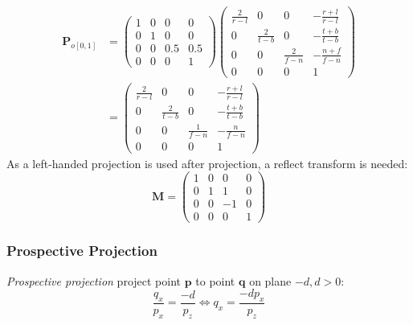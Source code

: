 \documentclass[10pt, a4paper]{article}
\begin{document}
            \begin{align*}
                \textbf{P}_{o[0, 1]}
                &= 
                \begin{pmatrix}
                    1 & 0 & 0 & 0\\
                    0 & 1 & 0 & 0\\
                    0 & 0 & 0.5 & 0.5\\
                    0 & 0 & 0 & 1 
                \end{pmatrix}
                \begin{pmatrix}
                    \frac{2}{r - l} & 0 & 0 & -\frac{r + l}{r - l}\\
                    0 & \frac{2}{t - b} & 0 & -\frac{t + b}{t - b}\\
                    0 & 0 & \frac{2}{f - n} & -\frac{n + f}{f - n}\\
                    0 & 0 & 0 & 1
                \end{pmatrix}\\
                &=
                \begin{pmatrix}
                \frac{2}{r - l} & 0 & 0 & -\frac{r + l}{r - l}\\
                0 & \frac{2}{t - b} & 0 & -\frac{t + b}{t - b}\\
                0 & 0 & \frac{1}{f - n} & -\frac{n}{f - n}\\
                0 & 0 & 0 & 1
                \end{pmatrix}
            \end{align*}
            \indent As a left-handed projection is used after projection, a reflect transform is needed:\\
            \begin{equation*}
                \textbf{M} =
                \begin{pmatrix}
                    1 & 0 & 0 & 0 \\
                    0 & 1 & 1 & 0 \\ 
                    0 & 0 & -1 & 0\\
                    0 & 0 & 0 & 1
                \end{pmatrix}
            \end{equation*}
        \newpage 

        \subsubsection{Prospective Projection}
            \emph{Prospective projection} project point $\textbf{p}$ to point $\textbf{q}$ on plane $-d, d > 0$:
                $$ \frac{q_x}{p_x} = \frac{-d}{p_z} \iff q_x = \frac{-dp_x}{p_z}$$
            
\end{document}
